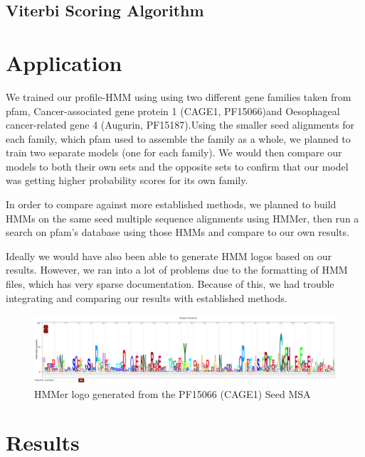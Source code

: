 \documentclass{article}
\begin{document}
\subsection{Viterbi Scoring Algorithm}



\section{Application}
We trained our profile-HMM using using two different gene families taken from pfam, Cancer-associated gene protein 1 (CAGE1, PF15066)\footnotemark[3] and Oesophageal cancer-related gene 4 (Augurin, PF15187).\footnotemark[4] Using the smaller seed alignments for each family, which pfam used to assemble the family as a whole, we planned to train two separate models (one for each family). We would then compare our models to both their own sets and the opposite sets to confirm that our model was getting higher probability scores for its own family.

In order to compare against more established methods, we planned to build HMMs on the same seed multiple sequence alignments using HMMer, then run a search on pfam's database using those HMMs and compare to our own results.

Ideally we would have also been able to generate HMM logos based on our results. However, we ran into a lot of problems due to the formatting of HMM files, which has very sparse documentation. Because of this, we had trouble integrating and comparing our results with established methods.

\begin{figure}[H]
\centering
\includegraphics[width=1.0\textwidth]{materials/HMMerLogo.png}
\caption{HMMer logo generated from the PF15066 (CAGE1) Seed MSA}
\end{figure}




\section{Results}
\end{document}
